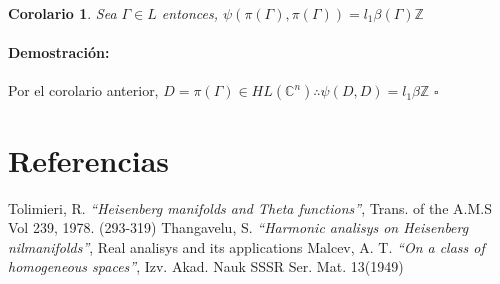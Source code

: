 \documentclass[12pt]{article}
\newtheorem{corollary}{Corolario}
\newenvironment{proof}{\paragraph{Demostración:}}{\hfill$\square$}
\begin{document}
 \begin{corollary}
  Sea $\Gamma  \in L$ entonces, $\psi(\pi(\Gamma),\pi(\Gamma))=l_1 \beta(\Gamma) \mathbb{Z}$  
 \end{corollary}
 \begin{proof}
  Por el corolario anterior, $D=\pi(\Gamma) \in HL(\mathbb{C}^n) \therefore \psi(D,D)=l_1 \beta \mathbb{Z}$  
 \end{proof}



 





 \section{Referencias}
  \begin{thebibliography}{1}
   Tolimieri, R.   \emph{``Heisenberg manifolds and Theta functions''}, Trans. of the A.M.S Vol 239, 1978. (293-319)
   Thangavelu, S.  \emph{``Harmonic analisys on Heisenberg nilmanifolds''}, Real analisys and its applications
   Malcev, A. T.  \emph{``On a class of homogeneous spaces''}, Izv. Akad. Nauk SSSR Ser. Mat. 13(1949)
  
  \end{thebibliography}
\end{document}

